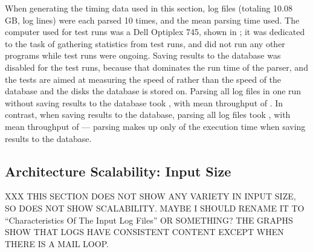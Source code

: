 When generating the timing data used in this section, \numberOFlogFILES{}
log files (totaling 10.08 GB, \numberOFlogLINEShuman{} log lines) were each
parsed 10 times, and the mean parsing time used.  The computer used for
test runs was a Dell Optiplex 745, shown in ; it was dedicated to the task of
gathering statistics from test runs, and did not run any other programs
while test runs were ongoing.  Saving results to the database was disabled
for the test runs, because that dominates the run time of the parser, and
the tests are aimed at measuring the speed of \parsername{} rather than the
speed of the database and the disks the database is stored on.  Parsing all
\numberOFlogFILES{} log files in one run without saving results to the
database took , with mean throughput
of .  In contrast, when saving
results to the database, parsing all \numberOFlogFILES{} log files took
, with mean throughput of
 --- parsing makes up only
 of the
execution time when saving results to the database.

\subsection{Architecture Scalability: Input Size}

XXX THIS SECTION DOES NOT SHOW ANY VARIETY IN INPUT SIZE, SO DOES NOT SHOW
SCALABILITY\@.  MAYBE I SHOULD RENAME IT TO ``Characteristics Of The Input
Log Files'' OR SOMETHING\@?  THE GRAPHS SHOW THAT LOGS HAVE CONSISTENT
CONTENT EXCEPT WHEN THERE IS A MAIL LOOP\@.

